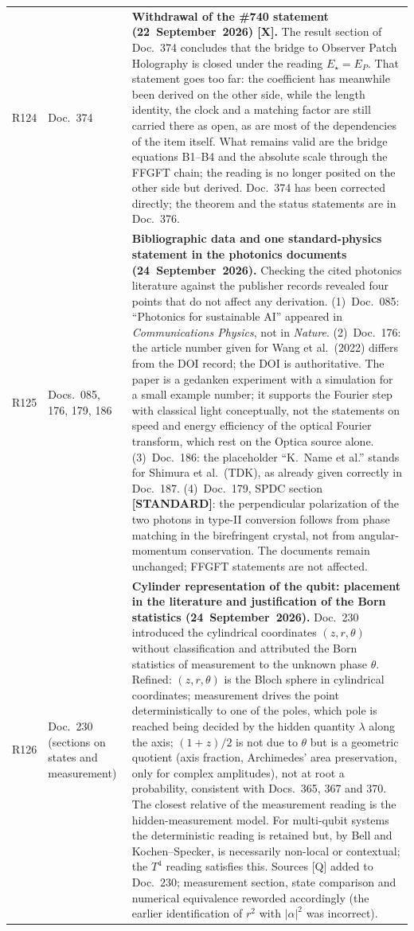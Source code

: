 \begin{longtable}{@{}p{0.9cm}p{3.1cm}p{10.2cm}@{}}
R124 & Doc.~374 & \textbf{Withdrawal of the \#740 statement (22~September~2026) [X].} The result section of Doc.~374 concludes that the bridge to Observer Patch Holography is closed under the reading $E_\star=E_P$. That statement goes too far: the coefficient has meanwhile been derived on the other side, while the length identity, the clock and a matching factor are still carried there as open, as are most of the dependencies of the item itself. What remains valid are the bridge equations B1--B4 and the absolute scale through the FFGFT chain; the reading is no longer posited on the other side but derived. Doc.~374 has been corrected directly; the theorem and the status statements are in Doc.~376. \\
R125 & Docs.~085, 176, 179, 186 & \textbf{Bibliographic data and one standard-physics statement in the photonics documents (24~September~2026).} Checking the cited photonics literature against the publisher records revealed four points that do not affect any derivation. (1)~Doc.~085: ``Photonics for sustainable AI'' appeared in \emph{Communications Physics}, not in \emph{Nature}. (2)~Doc.~176: the article number given for Wang et al.\ (2022) differs from the DOI record; the DOI is authoritative. The paper is a gedanken experiment with a simulation for a small example number; it supports the Fourier step with classical light conceptually, not the statements on speed and energy efficiency of the optical Fourier transform, which rest on the Optica source alone. (3)~Doc.~186: the placeholder ``K.~Name et al.'' stands for Shimura et al.\ (TDK), as already given correctly in Doc.~187. (4)~Doc.~179, SPDC section \textbf{[STANDARD]}: the perpendicular polarization of the two photons in type-II conversion follows from phase matching in the birefringent crystal, not from angular-momentum conservation. The documents remain unchanged; FFGFT statements are not affected. \\
R126 & Doc.~230 (sections on states and measurement) & \textbf{Cylinder representation of the qubit: placement in the literature and justification of the Born statistics (24~September~2026).} Doc.~230 introduced the cylindrical coordinates $(z,r,\theta)$ without classification and attributed the Born statistics of measurement to the unknown phase $\theta$. Refined: $(z,r,\theta)$ is the Bloch sphere in cylindrical coordinates; measurement drives the point deterministically to one of the poles, which pole is reached being decided by the hidden quantity $\lambda$ along the axis; $(1+z)/2$ is not due to $\theta$ but is a geometric quotient (axis fraction, Archimedes' area preservation, only for complex amplitudes), not at root a probability, consistent with Docs.~365, 367 and 370. The closest relative of the measurement reading is the hidden-measurement model. For multi-qubit systems the deterministic reading is retained but, by Bell and Kochen--Specker, is necessarily non-local or contextual; the $T^4$ reading satisfies this. Sources [Q] added to Doc.~230; measurement section, state comparison and numerical equivalence reworded accordingly (the earlier identification of $r^2$ with $|\alpha|^2$ was incorrect). \\

\end{longtable}
